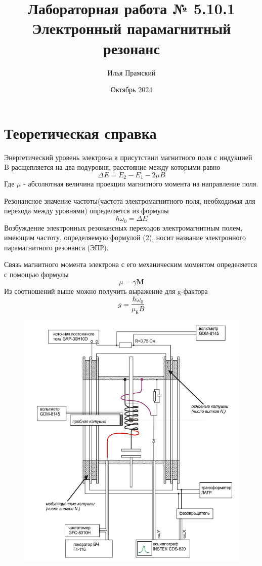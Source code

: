 \documentclass[a4paper,12pt]{article}
\title{Лабораторная работа № 5.10.1\\Электронный парамагнитный резонанс}
\author{Илья Прамский}
\date{Октябрь 2024}
\begin{document}
\maketitle
\newpage
\section{Теоретическая справка}

Энергетический уровень электрона в присутствии магнитного поля с индукцией B расщепляется на два подуровня, расстояние между которыми равно
\begin{equation}
\Delta E = E_2 - E_1 - 2 \mu B
\end{equation}
Где $\mu$ - абсолютная величина проекции магнитного момента на направление поля.

Резонансное значение частоты(частота электромагнитного поля, необходимая для перехода между уровнями) определяется из формулы 
\begin{equation}
\hbar \omega_0 = \Delta E
\end{equation}
Возбуждение электронных резонансных переходов электромагнитным полем, имеющим частоту, определяемую формулой (2), носит название электронного парамагнитного резонанса (ЭПР).

Связь магнитного момента электрона с его механическим моментом определяется с помощью формулы
\begin{equation}
\textbf{$\mu$} = \gamma \textbf{M}
\end{equation}
Из соотношений выше можно получить выражение для g-фактора
\begin{equation}
g = \frac{\hbar \omega_0}{\mu_{\text{Б}} B}
\end{equation}

\begin{figure}[H]
\centering
\includegraphics[scale=0.8]{scheme.png}
\end{figure}
\end{document}
